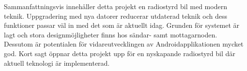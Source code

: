 \documentclass[a4paper]{article}
\begin{document}



\vspace{5mm} \noindent
Sammanfattningsvis innehåller detta projekt en radiostyrd bil med modern teknik. Uppgradering med nya datorer reducerar utdaterad teknik och dess funktioner passar väl in med det som är aktuellt idag. Grunden för systemet är lagt och stora designmöjligheter finns hos sändar- samt mottagarnoden. Dessutom är potentialen för vidareutvecklingen av Androidapplikationen mycket god. Kort sagt öppnar detta projekt upp för en nyskapande radiostyrd bil där aktuell teknologi är implementerad.




\newpage


\end{document}
